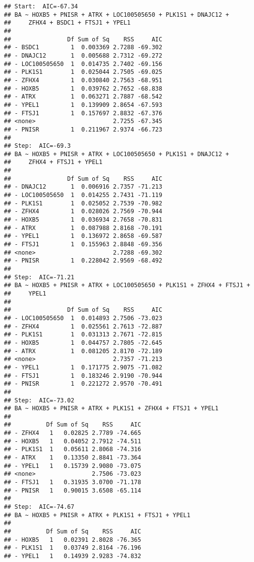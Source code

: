 \documentclass[12pt,dutch,coursenotes]{book}
\theoremstyle{definition}
\theoremstyle{definition}
\theoremstyle{definition}
\theoremstyle{remark}
\begin{document}
\begin{verbatim}
## Start:  AIC=-67.34
## BA ~ HOXB5 + PNISR + ATRX + LOC100505650 + PLK1S1 + DNAJC12 + 
##     ZFHX4 + BSDC1 + FTSJ1 + YPEL1
## 
##                Df Sum of Sq    RSS     AIC
## - BSDC1         1  0.003369 2.7288 -69.302
## - DNAJC12       1  0.005688 2.7312 -69.272
## - LOC100505650  1  0.014735 2.7402 -69.156
## - PLK1S1        1  0.025044 2.7505 -69.025
## - ZFHX4         1  0.030840 2.7563 -68.951
## - HOXB5         1  0.039762 2.7652 -68.838
## - ATRX          1  0.063271 2.7887 -68.542
## - YPEL1         1  0.139909 2.8654 -67.593
## - FTSJ1         1  0.157697 2.8832 -67.376
## <none>                      2.7255 -67.345
## - PNISR         1  0.211967 2.9374 -66.723
## 
## Step:  AIC=-69.3
## BA ~ HOXB5 + PNISR + ATRX + LOC100505650 + PLK1S1 + DNAJC12 + 
##     ZFHX4 + FTSJ1 + YPEL1
## 
##                Df Sum of Sq    RSS     AIC
## - DNAJC12       1  0.006916 2.7357 -71.213
## - LOC100505650  1  0.014255 2.7431 -71.119
## - PLK1S1        1  0.025052 2.7539 -70.982
## - ZFHX4         1  0.028026 2.7569 -70.944
## - HOXB5         1  0.036934 2.7658 -70.831
## - ATRX          1  0.087988 2.8168 -70.191
## - YPEL1         1  0.136972 2.8658 -69.587
## - FTSJ1         1  0.155963 2.8848 -69.356
## <none>                      2.7288 -69.302
## - PNISR         1  0.228042 2.9569 -68.492
## 
## Step:  AIC=-71.21
## BA ~ HOXB5 + PNISR + ATRX + LOC100505650 + PLK1S1 + ZFHX4 + FTSJ1 + 
##     YPEL1
## 
##                Df Sum of Sq    RSS     AIC
## - LOC100505650  1  0.014893 2.7506 -73.023
## - ZFHX4         1  0.025561 2.7613 -72.887
## - PLK1S1        1  0.031313 2.7671 -72.815
## - HOXB5         1  0.044757 2.7805 -72.645
## - ATRX          1  0.081205 2.8170 -72.189
## <none>                      2.7357 -71.213
## - YPEL1         1  0.171775 2.9075 -71.082
## - FTSJ1         1  0.183246 2.9190 -70.944
## - PNISR         1  0.221272 2.9570 -70.491
## 
## Step:  AIC=-73.02
## BA ~ HOXB5 + PNISR + ATRX + PLK1S1 + ZFHX4 + FTSJ1 + YPEL1
## 
##          Df Sum of Sq    RSS     AIC
## - ZFHX4   1   0.02825 2.7789 -74.665
## - HOXB5   1   0.04052 2.7912 -74.511
## - PLK1S1  1   0.05611 2.8068 -74.316
## - ATRX    1   0.13350 2.8841 -73.364
## - YPEL1   1   0.15739 2.9080 -73.075
## <none>                2.7506 -73.023
## - FTSJ1   1   0.31935 3.0700 -71.178
## - PNISR   1   0.90015 3.6508 -65.114
## 
## Step:  AIC=-74.67
## BA ~ HOXB5 + PNISR + ATRX + PLK1S1 + FTSJ1 + YPEL1
## 
##          Df Sum of Sq    RSS     AIC
## - HOXB5   1   0.02391 2.8028 -76.365
## - PLK1S1  1   0.03749 2.8164 -76.196
## - YPEL1   1   0.14939 2.9283 -74.832

\end{verbatim}
\end{document}
